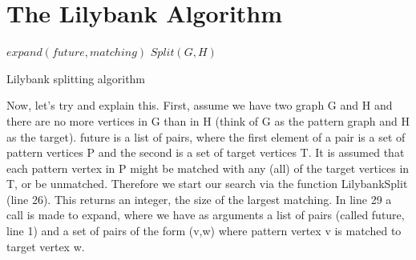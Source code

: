 \documentclass[letterpaper]{article}
\begin{document}
\section{The Lilybank Algorithm}

\begin{algorithm}
\DontPrintSemicolon
\nl $expand(\mathit{future},matching)$ \;
\nl {}
\;
\nl $Split(G,H)$ \;
\nl {}
\caption{Lilybank splitting algorithm}
\label{jtAlg}
\end{algorithm}

\noindent
Now, let's try and explain this. First, assume we have two graph G and H and there are no more vertices in G than in H (think of G as the pattern graph and H as the target).
future is a list of pairs, where the first element of a pair is a set of pattern vertices P and the second is a set of target vertices T. It is assumed that each pattern vertex in P 
might be matched with any (all) of the target vertices in T, or be unmatched. Therefore we start our search via the function LilybankSplit (line 26). This returns an integer, the size of the largest matching.
In line 29 a call is made to expand, where we have as arguments a list of pairs (called future, line 1) and a set of pairs of the form (v,w) where pattern vertex v is matched to target vertex w.
\end{document}
